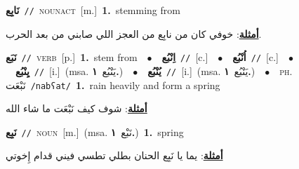 \documentclass[10pt,a4paper,twoside]{article} %
\begin{document}
\begin{multicols}{2}
{\setlength\topsep{0pt}\textbf{\foreignlanguage{arabic}{نَابِع}}\ {\color{gray}\texttt{//}\color{black}}\ \textsc{noun\textunderscore act}\ [m.]\ \textbf{1.}~stemming from\  \begin{flushright}\color{gray}\foreignlanguage{arabic}{\textbf{\underline{\foreignlanguage{arabic}{أمثلة}}}: خوفي كان من نابِع من العجز اللي صابني من بعد الحرب.}\end{flushright}\color{black}} \vspace{2mm}

{\setlength\topsep{0pt}\textbf{\foreignlanguage{arabic}{نَبَع}}\ {\color{gray}\texttt{//}\color{black}}\ \textsc{verb}\ [p.]\ \textbf{1.}~stem from\ \ $\bullet$\ \ \setlength\topsep{0pt}\textbf{\foreignlanguage{arabic}{اِنْبُع}}\ {\color{gray}\texttt{//}\color{black}}\ [c.]\ \ $\bullet$\ \ \setlength\topsep{0pt}\textbf{\foreignlanguage{arabic}{اُنْبُع}}\ {\color{gray}\texttt{//}\color{black}}\ [c.]\ \ $\bullet$\ \ \setlength\topsep{0pt}\textbf{\foreignlanguage{arabic}{يِنْبُع}}\ {\color{gray}\texttt{//}\color{black}}\ [i.]\ \color{gray}(msa. \foreignlanguage{arabic}{يَنْبُع}~\foreignlanguage{arabic}{\textbf{١.}})\color{black}\ \ $\bullet$\ \ \setlength\topsep{0pt}\textbf{\foreignlanguage{arabic}{يُنْبُع}}\ {\color{gray}\texttt{//}\color{black}}\ [i.]\ \color{gray}(msa. \foreignlanguage{arabic}{يَنْبُع}~\foreignlanguage{arabic}{\textbf{١.}})\color{black}\ \ $\bullet$\ \ \textsc{ph.} \color{gray} \foreignlanguage{arabic}{نَبْعَت}\color{black}\ {\color{gray}\texttt{/{\sffamily nabʕat}/}\color{black}}\ \textbf{1.}~rain heavily and form a spring\  \begin{flushright}\color{gray}\foreignlanguage{arabic}{\textbf{\underline{\foreignlanguage{arabic}{أمثلة}}}: شوف كيف نَبْعَت ما شاء الله}\end{flushright}\color{black}} \vspace{2mm}

{\setlength\topsep{0pt}\textbf{\foreignlanguage{arabic}{نَبِع}}\ {\color{gray}\texttt{//}\color{black}}\ \textsc{noun}\ [m.]\ \color{gray}(msa. \foreignlanguage{arabic}{نَبْع}~\foreignlanguage{arabic}{\textbf{١.}})\color{black}\ \textbf{1.}~spring\  \begin{flushright}\color{gray}\foreignlanguage{arabic}{\textbf{\underline{\foreignlanguage{arabic}{أمثلة}}}: يما يا نَبِع الحنان بطلي تطسي فيني قدام إِخوتي}\end{flushright}\color{black}} \vspace{2mm}


\end{multicols}
\end{document}
